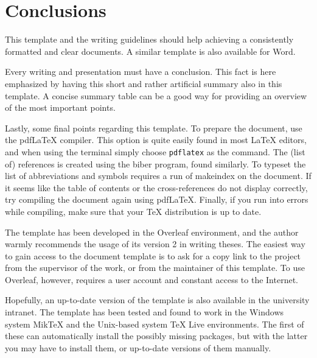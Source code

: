 \chapter{Conclusions}
\label{ch:conclusion}

This template and the writing guidelines should help achieving a consistently formatted and clear documents. A similar template is also available for Word.

Every writing and presentation must have a conclusion. This fact is here emphasized by having this short and rather artificial summary also in this template. A concise summary table can be a good way for providing an overview of the most important points.

Lastly, some final points regarding this template. To prepare the document, use the pdf\LaTeX{} compiler. This option is quite easily found in most \LaTeX{} editors, and when using the terminal simply choose \texttt{pdflatex} as the command. The (list of) references is created using the biber program, found similarly. To typeset the list of abbreviations and symbols requires a run of makeindex on the document. If it seems like the table of contents or the cross-references do not display correctly, try compiling the document again using pdf\LaTeX{}. Finally, if you run into errors while compiling, make sure that your \TeX{} distribution is up to date.

The template has been developed in the Overleaf environment, and the author warmly recommends the usage of its version 2 in writing theses. The easiest way to gain access to the document template is to ask for a copy link to the project from the supervisor of the work, or from the maintainer of this template. To use Overleaf, however, requires a user account and constant access to the Internet.

Hopefully, an up-to-date version of the template is also available in the university intranet. The template has been tested and found to work in the Windows system Mik\TeX{} and the Unix-based system \TeX{} Live environments. The first of these can automatically install the possibly missing packages, but with the latter you may have to install them, or up-to-date versions of them manually.